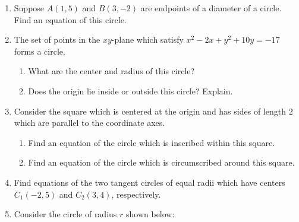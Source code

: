\documentclass[12pt]{article}
\newif\ifans
\begin{document}
\begin{enumerate}
\ifans\fbox{$(x-3)^2+(y-5)^2=36$}\fi

\item Suppose $A(1,5)$ and $B(3,-2)$ are endpoints of a diameter of a circle.  Find an equation of this circle.

\ifans\fbox{$(x-2)^2+\left(y-\frac{3}{2}\right)^2=\frac{53}{4}$}\fi

\item The set of points in the $xy$-plane which satisfy $x^2-2x+y^2+10y=-17$ forms a circle.

\begin{enumerate}

\item What are the center and radius of this circle?

\ifans\fbox{Center $(1,-5)$, radius $r=3$} \fi

\item Does the origin lie inside or outside this circle?  Explain.

\ifans{\fbox{The origin is outside of the circle.}}\fi

\end{enumerate}

\item Consider the square which is centered at the origin and has sides of length $2$ which are parallel to the coordinate axes.

\begin{enumerate}

\item Find an equation of the circle which is inscribed within this square.

\ifans{\fbox{$x^2+y^2=1$}} \fi

\item Find an equation of the circle which is circumscribed around this square.

\ifans{\fbox{$x^2+y^2=2$}} \fi

\end{enumerate}

\item Find equations of the two tangent circles of equal radii which have centers $C_1(-2,5)$ and $C_2(3,4)$, respectively.

\ifans{\fbox{$(x+2)^2+(y-5)^2=\frac{13}{2}$ and $(x-3)^2+(y-4)^2=\frac{13}{2}$}} \fi

\item Consider the circle of radius $r$ shown below:


\end{enumerate}
\end{document}
